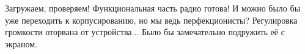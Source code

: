Загружаем, проверяем! Функциональная часть радио готова! И можно было бы уже переходить к корпусированию, но мы ведь перфекционисты? Регулировка громкости оторвана от устройства... Было бы замечательно подружить её с экраном.

